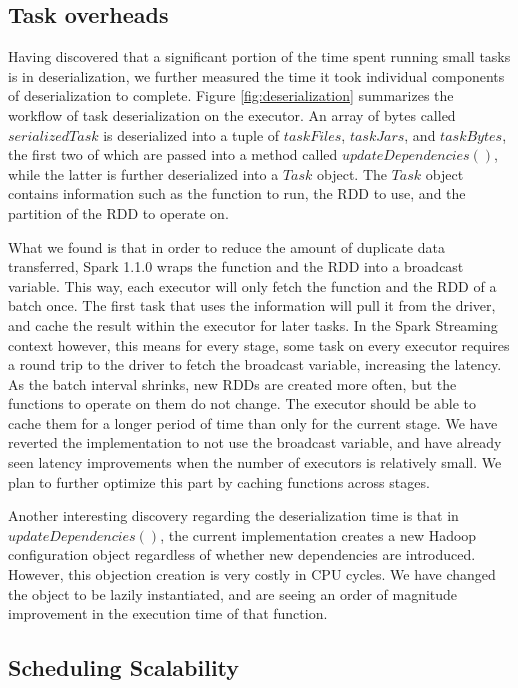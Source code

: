 \subsection{Task overheads}
Having discovered that a significant portion of the time spent running small tasks is in deserialization, we further measured the time it took individual components of deserialization to complete. Figure \ref{fig:deserialization} summarizes the workflow of task deserialization on the executor. An array of bytes called $serializedTask$ is deserialized into a tuple of $taskFiles$, $taskJars$, and $taskBytes$, the first two of which are passed into a method called $updateDependencies()$, while the latter is further deserialized into a $Task$ object. The $Task$ object contains information such as the function to run, the RDD to use, and the partition of the RDD to operate on.


What we found is that in order to reduce the amount of duplicate data transferred, Spark 1.1.0 wraps the function and the RDD into a broadcast variable. This way, each executor will only fetch the function and the RDD of a batch once. The first task that uses the information will pull it from the driver, and cache the result within the executor for later tasks. In the Spark Streaming context however, this means for every stage, some task on every executor requires a round trip to the driver to fetch the broadcast variable, increasing the latency. As the batch interval shrinks, new RDDs are created more often, but the functions to operate on them do not change. The executor should be able to cache them for a longer period of time than only for the current stage. We have reverted the implementation to not use the broadcast variable, and have already seen latency improvements when the number of executors is relatively small. We plan to further optimize this part by caching functions across stages.

Another interesting discovery regarding the deserialization time is that in $updateDependencies()$, the current implementation creates a new Hadoop configuration object regardless of whether new dependencies are introduced. However, this objection creation is very costly in CPU cycles. We have changed the object to be lazily instantiated, and are seeing an order of magnitude improvement in the execution time of that function.


\subsection{Scheduling Scalability}


